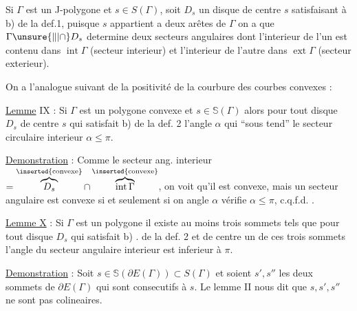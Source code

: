 Si $\Gamma$ est un J-polygone et $s\in S(\Gamma)$, soit $D_s$ un disque de centre $s$ satisfaisant à b) de la def.1, puisque $s$ appartient a deux arêtes de $\Gamma$ on a que $\Gamma\unsure{\Vert|\cap}D_s$ determine deux secteurs angulaires dont l'interieur de l'un est contenu dans $\operatorname{int}\Gamma$ (secteur interieur) et l'interieur de l'autre dans $\operatorname{ext}\Gamma$ (secteur exterieur).

\margin{$\unsure{\cdot|\bullet}$}
On a   l'analogue suivant de la positivité de la courbure des courbes  convexes :

\uline{Lemme} IX : Si $\Gamma$ est un polygone convexe et $s\in\mathbb{S}(\Gamma)$ alors pour tout disque $D_s$ de centre $s$ qui satisfait b) de la def. 2 l'angle $\alpha$ qui ``sous tend'' le secteur circulaire interieur  $\alpha\le\pi$.

\uline{Demonstration} : Comme le secteur ang. interieur $=\overbrace{D_s}^{\inserted{\text{convexe}}}\cap\overbrace{\operatorname{int}\Gamma}^{\inserted{\text{convexe}}}$, on voit qu'il est convexe, mais un secteur angulaire est convexe si et seulement si on angle $\alpha$ vérifie $\alpha\le\pi$, c.q.f.d. .


\uline{Lemme X} : Si $\Gamma$ est un polygone il existe au moins trois sommets tels que pour tout disque $D_s$ qui satisfait b) . de la def. 2 et de centre un de ces trois sommets l'angle du secteur angulaire interieur est inferieur à $\pi$.

\uline{Demonstration} : Soit $s\in\mathbb{S}(\partial E(\Gamma))\subset S(\Gamma)$ et soient $s',s''$ les deux sommets de $\partial E(\Gamma)$ qui sont consecutifs à $s$. Le lemme II nous dit que $s,s',s''$ ne sont pas colineaires.
